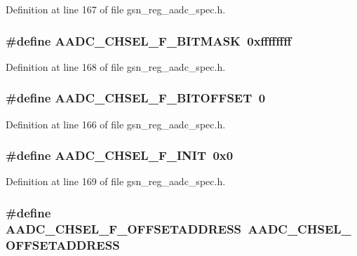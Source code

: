 Definition at line 167 of file gsn\_\-reg\_\-aadc\_\-spec.h.

\hypertarget{a00543_aa2fcfd1a0a6aa9f1848c42211fd91621}{
\subsubsection[{AADC\_\-CHSEL\_\-F\_\-BITMASK}]{\setlength{\rightskip}{0pt plus 5cm}\#define AADC\_\-CHSEL\_\-F\_\-BITMASK~0xffffffff}}
\label{a00543_aa2fcfd1a0a6aa9f1848c42211fd91621}


Definition at line 168 of file gsn\_\-reg\_\-aadc\_\-spec.h.

\hypertarget{a00543_ae6e9da493a2732771b7777dfffce66ed}{
\subsubsection[{AADC\_\-CHSEL\_\-F\_\-BITOFFSET}]{\setlength{\rightskip}{0pt plus 5cm}\#define AADC\_\-CHSEL\_\-F\_\-BITOFFSET~0}}
\label{a00543_ae6e9da493a2732771b7777dfffce66ed}


Definition at line 166 of file gsn\_\-reg\_\-aadc\_\-spec.h.

\hypertarget{a00543_a87adc2c0a6199bc0f20c73189f8d5182}{
\subsubsection[{AADC\_\-CHSEL\_\-F\_\-INIT}]{\setlength{\rightskip}{0pt plus 5cm}\#define AADC\_\-CHSEL\_\-F\_\-INIT~0x0}}
\label{a00543_a87adc2c0a6199bc0f20c73189f8d5182}


Definition at line 169 of file gsn\_\-reg\_\-aadc\_\-spec.h.

\hypertarget{a00543_a699b77be1fdd276e6a740195da0d5e05}{
\subsubsection[{AADC\_\-CHSEL\_\-F\_\-OFFSETADDRESS}]{\setlength{\rightskip}{0pt plus 5cm}\#define AADC\_\-CHSEL\_\-F\_\-OFFSETADDRESS~AADC\_\-CHSEL\_\-OFFSETADDRESS}}
\label{a00543_a699b77be1fdd276e6a740195da0d5e05}



